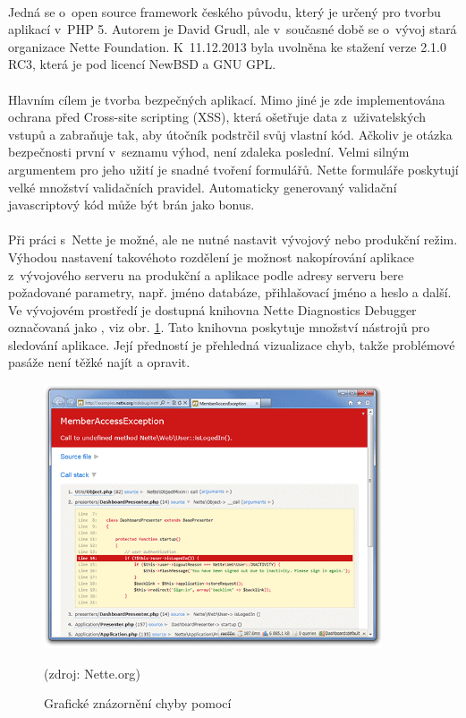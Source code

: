 \documentclass[11pt,a4paper,titlepage,oneside]{book}
\begin{document}
			\paragraph{} Jedná se o~open source framework českého původu, který je určený pro tvorbu aplikací v~PHP 5.  Autorem je David Grudl, ale v~současné době se o~vývoj stará organizace Nette Foundation. K~11.12.2013 byla uvolněna ke stažení verze 2.1.0 RC3, která je pod licencí NewBSD a GNU \ac{GPL}.  
			\paragraph{} Hlavním cílem je tvorba bezpečných aplikací. Mimo jiné je zde implementována ochrana před Cross-site scripting (XSS), která ošetřuje data z~uživatelských vstupů a zabraňuje tak, aby útočník podstrčil svůj vlastní kód. Ačkoliv je otázka bezpečnosti první v~seznamu výhod, není zdaleka poslední. Velmi silným argumentem pro jeho užití je snadné tvoření formulářů. Nette formuláře poskytují velké množství validačních pravidel. Automaticky generovaný validační javascriptový kód může být brán jako bonus.

			\label{par:ladenka}
			\paragraph{} Při práci s~Nette je možné, ale ne nutné nastavit vývojový nebo produkční režim. Výhodou nastavení takovéhoto rozdělení je možnost nakopírování aplikace z~vývojového serveru na produkční a aplikace podle adresy serveru bere požadované parametry, např. jméno databáze, přihlašovací jméno a heslo a další. Ve vývojovém prostředí je dostupná knihovna Nette Diagnostics Debugger označovaná jako , viz obr. \ref{fig:ladenka}. Tato knihovna poskytuje množství nástrojů pro sledování aplikace. Její předností je přehledná vizualizace chyb, takže problémové pasáže není těžké najít a opravit.
		\begin{figure}[!h]
			\begin{center}
				\includegraphics[width=10cm]{obrazky/ladenka.png}
				\caption{Grafické znázornění chyby pomocí }
				\label{fig:ladenka}
				(zdroj: Nette.org\cite{nette_web})
			\end{center}
		\end{figure}	
\end{document}
